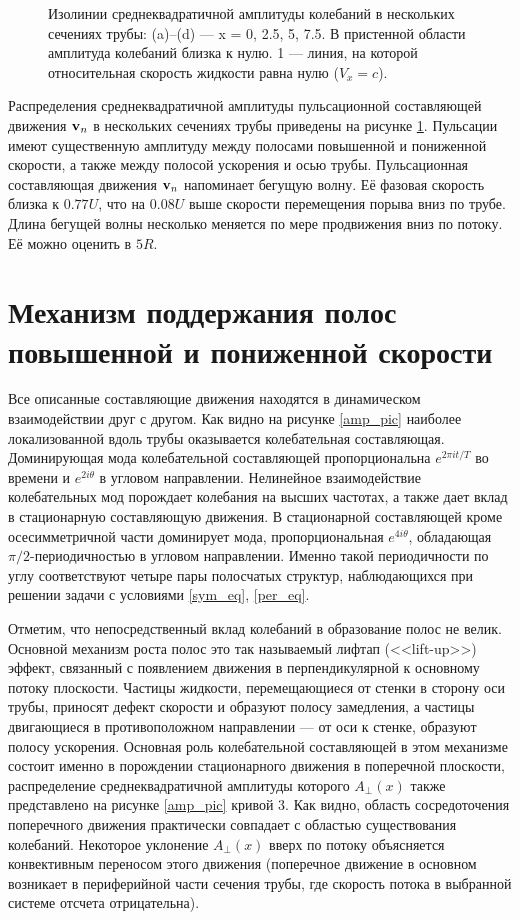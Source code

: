 \begin{figure}[h]
\caption{Изолинии среднеквадратичной амплитуды колебаний в нескольких сечениях трубы: (a)--(d) --- x = 0, 2.5, 5, 7.5. В пристенной области амплитуда колебаний близка к нулю. 1 --- линия, на которой относительная скорость жидкости равна нулю ($V_{x} = c$).}
\label{puls_cs_pic}
\end{figure}

Распределения среднеквадратичной амплитуды пульсационной составляющей движения $\mathbf{v}_n$ в нескольких сечениях трубы приведены на рисунке \ref{puls_cs_pic}. Пульсации имеют существенную амплитуду между полосами повышенной и пониженной скорости, а также между полосой ускорения и осью трубы. Пульсационная составляющая движения $\mathbf{v}_n$ напоминает бегущую волну. Её фазовая скорость близка к $0.77U$, что на $0.08U$ выше скорости перемещения порыва вниз по трубе. Длина бегущей волны несколько меняется по мере продвижения вниз по потоку. Её можно оценить в $5R$. 


\section{Механизм поддержания полос повышенной и пониженной скорости} 

Все описанные составляющие движения находятся в динамическом взаимодействии друг с другом. Как видно на рисунке \ref{amp_pic} наиболее локализованной вдоль трубы оказывается колебательная составляющая. Доминирующая мода колебательной составляющей пропорциональна $e^{2\pi it/T}$ во времени и $e^{2i\theta}$ в угловом направлении. Нелинейное взаимодействие колебательных мод порождает колебания на высших частотах, а также дает вклад в стационарную составляющую движения. В стационарной составляющей кроме осесимметричной части доминирует мода, пропорциональная $e^{4i\theta}$, обладающая $\pi/2$-периодичностью в угловом направлении. Именно такой периодичности по углу соответствуют четыре пары полосчатых структур, наблюдающихся при решении задачи с условиями \eqref{sym_eq}, \eqref{per_eq}.

Отметим, что непосредственный вклад колебаний в образование полос не велик. Основной механизм роста полос это так называемый лифтап (<<lift-up>>) эффект, связанный с появлением движения в перпендикулярной к основному потоку плоскости. Частицы жидкости, перемещающиеся от стенки в сторону оси трубы, приносят дефект скорости и образуют полосу замедления, а частицы двигающиеся в противоположном направлении --- от оси к стенке, образуют полосу ускорения. Основная роль колебательной составляющей в этом механизме состоит именно в порождении стационарного движения в поперечной плоскости, распределение среднеквадратичной амплитуды которого $A_{\perp}(x)$ также представлено на рисунке \ref{amp_pic} кривой 3. Как видно, область сосредоточения поперечного движения практически совпадает с областью существования колебаний. Некоторое уклонение $A_{\perp}(x)$ вверх по потоку объясняется конвективным переносом этого движения (поперечное движение в основном возникает в периферийной части сечения трубы, где скорость потока в выбранной системе отсчета отрицательна).

